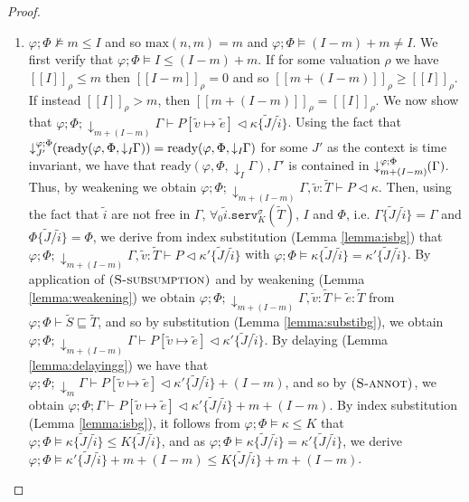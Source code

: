 \begin{theorem}
\begin{proof}
\begin{description}
\begin{enumerate}
        \item $\varphi;\Phi\nvDash m \leq I$ and so $\text{max}(n,m)=m$ and $\varphi;\Phi\vDash (I-m)+m\neq I$. We first verify that $\varphi;\Phi\vDash I \leq (I-m)+m$. If for some valuation $\rho$ we have $[\![I]\!]_\rho\leq m$ then $[\![I-m]\!]_\rho = 0$ and so $[\![m+(I-m)]\!]_\rho\geq [\![I]\!]_\rho$. If instead $[\![I]\!]_\rho > m$, then $[\![m+(I-m)]\!]_\rho=[\![I]\!]_\rho$. We now show that $\varphi;\Phi;\downarrow_{m+(I-m)}\!\!\Gamma\vdash P[\widetilde{v}\mapsto \widetilde{e}] \triangleleft \kappa\{\widetilde{J}/\widetilde{i}\}$. Using the fact that $\susume{\text{ready}(\varphi,\Phi,\downarrow_I\!\!\Gamma)}{\varphi}{\Phi}{J'}=\text{ready}(\varphi,\Phi,\downarrow_I\!\!\Gamma)$ for some $J'$ as the context is time invariant, we have that $\text{ready}(\varphi,\Phi,\downarrow_I\!\!\Gamma),\Gamma'$ is contained in $\susume{\Gamma}{\varphi}{\Phi}{m+(I-m)}$. Thus, by weakening we obtain $\varphi;\Phi;\downarrow_{m+(I-m)}\!\!\Gamma,\widetilde{v}:\widetilde{T}\vdash P \triangleleft \kappa$. Then, using the fact that $\widetilde{i}$ are not free in $\Gamma$, $\forall_{0}\widetilde{i}.\texttt{serv}^{\sigma}_K(\widetilde{T})$, $I$ and $\Phi$, i.e. $\Gamma\{\widetilde{J}/\widetilde{i}\}=\Gamma$ and $\Phi\{\widetilde{J}/\widetilde{i}\}=\Phi$, we derive from index substitution (Lemma \ref{lemma:isbg}) that $\varphi;\Phi;\downarrow_{m+(I-m)}\!\!\Gamma,\widetilde{v}:\widetilde{T}\vdash P \triangleleft \kappa'\{\widetilde{J}/\widetilde{i}\}$ with $\varphi;\Phi\vDash \kappa\{\widetilde{J}/\widetilde{i}\} = \kappa'\{\widetilde{J}/\widetilde{i}\}$. By application of $\runa{S-subsumption}$ and by weakening (Lemma \ref{lemma:weakening}) we obtain $\varphi;\Phi;\downarrow_{m+(I-m)}\!\!\Gamma,\widetilde{v}:\widetilde{T}\vdash \widetilde{e} : \widetilde{T}$ from $\varphi;\Phi\vdash \widetilde{S} \sqsubseteq \widetilde{T}$, and so by substitution (Lemma \ref{lemma:substibg}), we obtain $\varphi;\Phi;\downarrow_{m+(I-m)}\!\!\Gamma\vdash P[\widetilde{v}\mapsto \widetilde{e}] \triangleleft \kappa'\{\widetilde{J}/\widetilde{i}\}$. By delaying (Lemma \ref{lemma:delayingg}) we have that $\varphi;\Phi;\downarrow_{m}\!\!\Gamma\vdash P[\widetilde{v}\mapsto \widetilde{e}] \triangleleft \kappa'\{\widetilde{J}/\widetilde{i}\} +(I-m)$, and so by $\runa{S-annot}$, we obtain $\varphi;\Phi;\Gamma\vdash P[\widetilde{v}\mapsto \widetilde{e}] \triangleleft \kappa'\{\widetilde{J}/\widetilde{i}\} + m+(I-m)$. By index substitution (Lemma \ref{lemma:isbg}), it follows from $\varphi;\Phi\vDash \kappa \leq K$ that $\varphi;\Phi\vDash \kappa\{\widetilde{J}/\widetilde{i}\} \leq K\{\widetilde{J}/\widetilde{i}\}$, and as $\varphi;\Phi\vDash \kappa\{\widetilde{J}/\widetilde{i}\} = \kappa'\{\widetilde{J}/\widetilde{i}\}$, we derive $\varphi;\Phi\vDash \kappa'\{\widetilde{J}/\widetilde{i}\}+ m+(I-m) \leq K\{\widetilde{J}/\widetilde{i}\} + m+(I-m)$.

\end{enumerate}
\end{description}
\end{proof}
\end{theorem}
